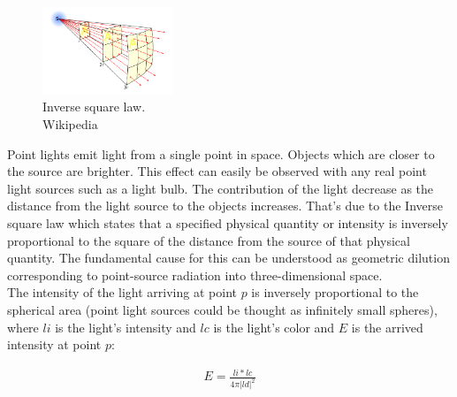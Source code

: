 \documentclass{article}
\begin{document}
\begin{figure}
	\centering
	\includegraphics[width=0.35\textwidth]{inverse_square_law}
	\caption{Inverse square law. \\ Wikipedia}
	\label{fig:inverse_square_law}
\end{figure}

Point lights emit light from a single point in space. Objects which are closer to the source are brighter. This effect can easily be observed with any real point light sources such as a light bulb. The contribution of the light decrease as the distance from the light source to the objects increases. That's due to the Inverse square law which states that a specified physical quantity or intensity is inversely proportional to the square of the distance from the source of that physical quantity. The fundamental cause for this can be understood as geometric dilution corresponding to point-source radiation into three-dimensional space. \cite{inverse_square_law}\\
The intensity of the light arriving at point $p$ is inversely proportional to the spherical area (point light sources could be thought as infinitely small spheres), where $li$ is the light's intensity and $lc$ is the light's color and $E$ is the arrived intensity at point $p$:

\begin{align}
E = \frac{li * lc}{4\pi |ld|^2}
\end{align}
\end{document}
